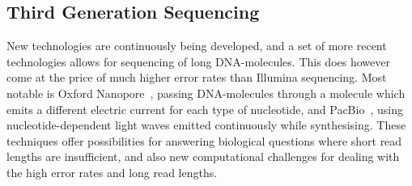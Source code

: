 \subsection{Third Generation Sequencing}
New technologies are continuously being developed, and a set of more recent technologies allows for sequencing of long DNA-molecules. This does however come at the price of much higher error rates than Illumina sequencing. Most notable is Oxford Nanopore~\cite{nanopore}, passing DNA-molecules through a molecule which emits a different electric current for each type of nucleotide, and PacBio~\cite{pacbio}, using  nucleotide-dependent light waves emitted continuously while synthesising.
These techniques offer possibilities for answering biological questions where short read lengths are insufficient, and also new computational challenges for dealing with the high error rates and long read lengths. 

